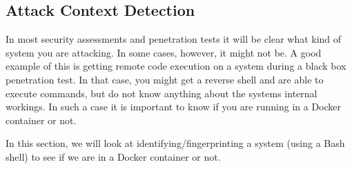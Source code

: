 \subsection{Attack Context Detection}
In most security assessments and penetration tests it will be clear what kind of system you are attacking. In some cases, however, it might not be. A good example of this is getting remote code execution on a system during a black box penetration test. In that case, you might get a reverse shell and are able to execute commands, but do not know anything about the systems internal workings. In such a case it is important to know if you are running in a Docker container or not.

In this section, we will look at identifying/fingerprinting a system (using a Bash shell) to see if we are in a Docker container or not.





